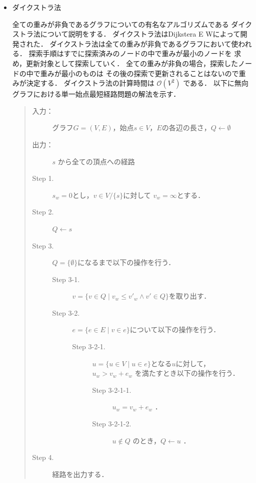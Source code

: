 \documentclass[12pt]{optlab-bachelor}
\begin{document}
\begin{itemize}
  \item ダイクストラ法

  全ての重みが非負であるグラフについての有名なアルゴリズムである
  ダイクストラ法について説明をする．
  ダイクストラ法はDijkstera E W\cite{Dijkstera}によって開発された．
  ダイクストラ法は全ての重みが非負であるグラフにおいて使われる．
  探索手順はすでに探索済みのノードの中で重みが最小のノードを
  求め，更新対象として探索していく．
  全ての重みが非負の場合，探索したノードの中で重みが最小のものは
  その後の探索で更新されることはないので重みが決定する．
  ダイクストラ法の計算時間は $\mathcal{\mathcal{O}}(V^2)$ である．
  以下に無向グラフにおける単一始点最短経路問題の解法を示す．

  \begin{quote}
    \begin{description}
      \item[入力：] グラフ$G=(V,E)$，始点$s \in V$，$E$の各辺の長さ，$Q \leftarrow \emptyset$
      \item[出力：] $s$ から全ての頂点への経路
      \item[Step 1.] $s_w = 0$とし，$v \in V/ \{ s\}$に対して $v_w = \infty$とする．
      \item[Step 2.] $Q \leftarrow s$
      \item[Step 3.] $Q = \{\emptyset\}$になるまで以下の操作を行う．
      \begin{description}
        \item[Step 3-1.] $v = \{ v \in Q \mid v_w \leq v'_w \land v' \in Q \}$を取り出す．
        \item[Step 3-2.] $e = \{ e \in E \mid v \in e \}$について以下の操作を行う．
        \begin{description}
          \item[Step 3-2-1.] $u = \{ u \in V \mid u \in e\}$となる$u$に対して，
          $u_w > v_w + e_w$ を満たすとき以下の操作を行う．

          \begin{description}
            \item[Step 3-2-1-1.] $u_w = v_w + e_w$ ．
            \item[Step 3-2-1-2.] $u \notin Q$ のとき，$Q \leftarrow u$ ．
          \end{description}
        \end{description}
      \end{description}

      \item[Step 4.] 経路を出力する．
    \end{description}
  \end{quote}
\end{itemize}
\end{document}
